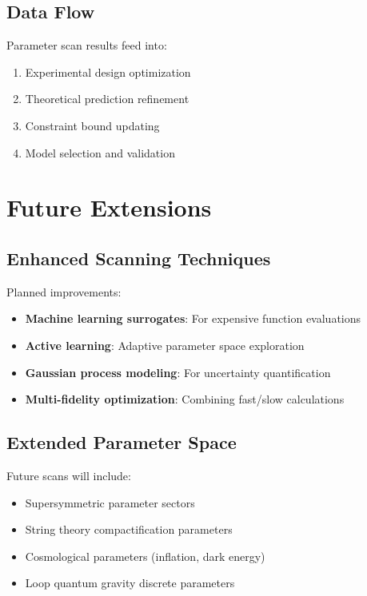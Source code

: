 \documentclass[11pt]{article}
\begin{document}
\subsection{Data Flow}

Parameter scan results feed into:
\begin{enumerate}
    \item Experimental design optimization
    \item Theoretical prediction refinement
    \item Constraint bound updating
    \item Model selection and validation
\end{enumerate}

\section{Future Extensions}

\subsection{Enhanced Scanning Techniques}

Planned improvements:
\begin{itemize}
    \item \textbf{Machine learning surrogates}: For expensive function evaluations
    \item \textbf{Active learning}: Adaptive parameter space exploration
    \item \textbf{Gaussian process modeling}: For uncertainty quantification
    \item \textbf{Multi-fidelity optimization}: Combining fast/slow calculations
\end{itemize}

\subsection{Extended Parameter Space}

Future scans will include:
\begin{itemize}
    \item Supersymmetric parameter sectors
    \item String theory compactification parameters
    \item Cosmological parameters (inflation, dark energy)
    \item Loop quantum gravity discrete parameters
\end{itemize}
\end{document}
